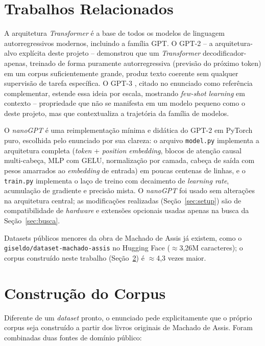 \documentclass[conference]{IEEEtran}
\begin{document}
\section{Trabalhos Relacionados}

A arquitetura \textit{Transformer} \cite{vaswani2017attention} é a base de
todos os modelos de linguagem autorregressivos modernos, incluindo a família
GPT. O GPT-2 \cite{radford2019gpt2} -- a arquitetura-alvo explícita deste
projeto -- demonstrou que um \textit{Transformer} decodificador-apenas,
treinado de forma puramente autorregressiva (previsão do próximo token) em um
corpus suficientemente grande, produz texto coerente sem qualquer supervisão
de tarefa específica. O GPT-3 \cite{brown2020gpt3}, citado no enunciado como
referência complementar, estende essa ideia por escala, mostrando
\textit{few-shot learning} em contexto -- propriedade que não se manifesta em
um modelo pequeno como o deste projeto, mas que contextualiza a trajetória da
família de modelos.

O \textit{nanoGPT} \cite{karpathy_nanogpt} é uma reimplementação mínima e
didática do GPT-2 em PyTorch puro, escolhida pelo enunciado por sua clareza:
o arquivo \texttt{model.py} implementa a arquitetura completa (\textit{token}
+ \textit{position embedding}, blocos de atenção causal multi-cabeça, MLP com
GELU, normalização por camada, cabeça de saída com pesos amarrados ao
\textit{embedding} de entrada) em poucas centenas de linhas, e o
\texttt{train.py} implementa o laço de treino com decaimento de
\textit{learning rate}, acumulação de gradiente e precisão mista. O
\textit{nanoGPT} foi usado sem alterações na arquitetura central; as
modificações realizadas (Seção~\ref{sec:setup}) são de compatibilidade de
\textit{hardware} e extensões opcionais usadas apenas na busca da
Seção~\ref{sec:busca}.

Datasets públicos menores da obra de Machado de Assis já existem, como o
\texttt{giseldo/dataset-machado-assis} \cite{giseldo_dataset} no Hugging Face
($\approx$3,26M caracteres); o corpus construído neste trabalho
(Seção~\ref{sec:corpus}) é $\approx$4,3 vezes maior.

\section{Construção do Corpus}
\label{sec:corpus}

Diferente de um \textit{dataset} pronto, o enunciado pede explicitamente que o
próprio corpus seja construído a partir dos livros originais de Machado de
Assis. Foram combinadas duas fontes de domínio público:
\end{document}
